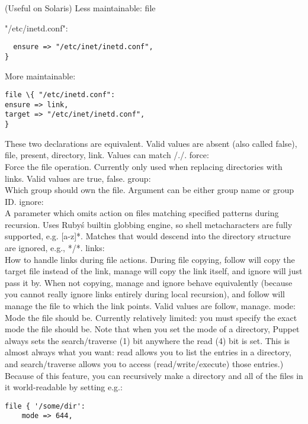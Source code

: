(Useful on Solaris)
Less maintainable: 
file { "/etc/inetd.conf":
\begin{code}
\begin{lstlisting}
  ensure => "/etc/inet/inetd.conf",
}
\end{lstlisting}
\end{code}

More maintainable:
\begin{code}
\begin{lstlisting}
file \{ "/etc/inetd.conf":
ensure => link,
target => "/etc/inet/inetd.conf",
}
\end{lstlisting}
\end{code}
%
These two declarations are equivalent. Valid values are absent (also called false), file, present, directory, link. Values can match /./.
force:\\
Force the file operation. Currently only used when replacing directories with links. Valid values are true, false.
%
group:\\
Which group should own the file. Argument can be either group name or group ID.
%
ignore:\\
A parameter which omits action on files matching specified patterns during recursion. Uses Ruby\'s builtin globbing engine, so shell metacharacters are fully supported, e.g. [a-z]*. Matches that would descend into the directory structure are ignored, e.g., */*.
%
links:\\
How to handle links during file actions. During file copying, follow will copy the target file instead of the link, manage will copy the link itself, and ignore will just pass it by. When not copying, manage and ignore behave equivalently (because you cannot really ignore links entirely during local recursion), and follow will manage the file to which the link points. Valid values are follow, manage.
%
mode:\\
Mode the file should be. Currently relatively limited: you must specify the exact mode the file should be.
Note that when you set the mode of a directory, Puppet always sets the search/traverse (1) bit anywhere the read (4) bit is set. This is almost always what you want: read allows you to list the entries in a directory, and search/traverse allows you to access (read/write/execute) those entries.) Because of this feature, you can recursively make a directory and all of the files in it world-readable by setting e.g.:
%
\begin{code}
\begin{lstlisting}
file { '/some/dir':
	mode => 644,

\end{lstlisting}
\end{code}}
